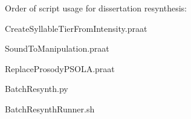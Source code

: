 Order of script usage for dissertation resynthesis:

CreateSyllableTierFromIntensity.praat

SoundToManipulation.praat

ReplaceProsodyPSOLA.praat

BatchResynth.py

BatchResynthRunner.sh
